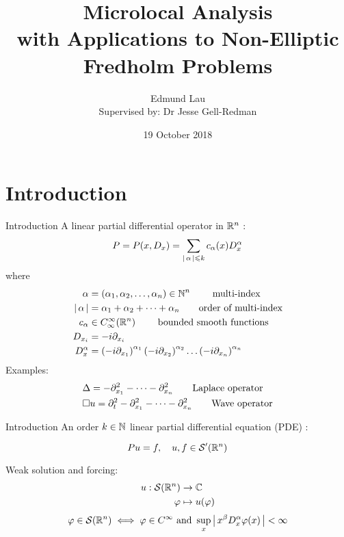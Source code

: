 \documentclass{beamer}
\title{Microlocal Analysis \\ 
    \large with Applications to Non-Elliptic Fredholm Problems}
\author{Edmund Lau \\
Supervised by: Dr Jesse Gell-Redman}
\institute[Unimelb] {
    The University of Melbourne \\ %
    \medskip
    \textit{elau1@student.unimelb.edu.au} %
}
\date{19 October 2018}
\begin{document}
    
\begin{frame}
\titlepage 
\end{frame}






\section{Introduction} 
\begin{frame}{Introduction}
A linear partial differential operator in ${\mathbb R}^n$ : 
\begin{equation}
P = P(x, D_x) = \sum_{\left|\, \alpha\,\right| \leqslant k} c_\alpha(x) D^\alpha_x 
\end{equation}
where 
\begin{align*}
\alpha &= (\alpha_1, \alpha_2, \dots, \alpha_n) \in {\ensuremath {\mathbb N}}^n \tag*{ multi-index } \\
\left|\, \alpha\,\right| &= \alpha_1 + \alpha_2 + \dots + \alpha_n \tag*{order of multi-index} \\
c_\alpha &\in C^\infty_\infty({\mathbb R}^n) \tag*{ bounded  smooth functions} \\
D_{x_i} &= -i \partial_{x_i} \\
D_x^\alpha & = \left(-i \partial_{x_1}\right)^{\alpha_1}\left(-i \partial_{x_2}\right)^{\alpha_2} \dots \left(-i \partial_{x_n}\right)^{\alpha_n} 
\end{align*}
Examples: 
\begin{align*}
&\Delta = - \partial_{x_1}^2  - \dots - \partial_{x_n}^2  \tag*{Laplace operator} \\
&\Box u = \partial_{t}^2  - \partial_{x_1}^2  - \dots - \partial_{x_n}^2 \tag*{Wave operator} 
\end{align*}
\end{frame} 


\begin{frame}{Introduction}
An order $k \in {\ensuremath {\mathbb N}}$ linear partial differential equation (PDE) : 

\begin{equation*}
P u = f, \quad u, f \in \mathcal{S}'({\mathbb R}^n)
\end{equation*}


Weak solution and forcing: 
\begin{align*}
u : \mathcal{S}({\mathbb R}^n) & \to {\ensuremath {\mathbb C}} \\
\varphi &\mapsto u(\varphi)
\end{align*}
\begin{align*}
\varphi  \in \mathcal{S}({\mathbb R}^n)  \iff 
 \varphi \in C^\infty \text{ and }  \sup_{x} \left|\, x^\beta D^\alpha_x \varphi (x)\,\right| < \infty 
\end{align*}

\end{frame} 
\end{document}
